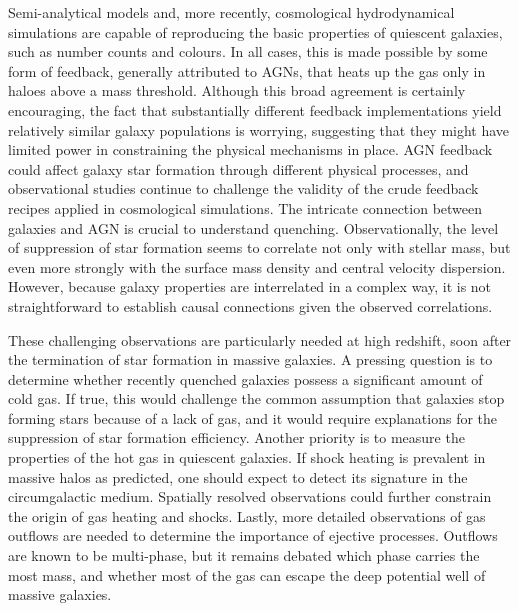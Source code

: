 \documentclass[a4paper,11pt]{article}
\begin{document}
{\noindent}Semi-analytical models and, more recently, cosmological hydrodynamical simulations are capable of reproducing the basic properties of quiescent galaxies, such as number counts and colours. In all cases, this is made possible by some form of feedback, generally attributed to AGNs, that heats up the gas only in haloes above a mass threshold. Although this broad agreement is certainly encouraging, the fact that substantially different feedback implementations yield relatively similar galaxy populations is worrying, suggesting that they might have limited power in constraining the physical mechanisms in place. AGN feedback could affect galaxy star formation through different physical processes, and observational studies continue to challenge the validity of the crude feedback recipes applied in cosmological simulations. The intricate connection between galaxies and AGN is crucial to understand quenching. Observationally, the level of suppression of star formation seems to correlate not only with stellar mass, but even more strongly with the surface mass density and central velocity dispersion. However, because galaxy properties are interrelated in a complex way, it is not straightforward to establish causal connections given the observed correlations.

{\noindent} These challenging observations are particularly needed at high redshift, soon after the termination of star formation in massive galaxies. A pressing question is to determine whether recently quenched galaxies possess a significant amount of cold gas. If true, this would challenge the common assumption that galaxies stop forming stars because of a lack of gas, and it would require explanations for the suppression of star formation efficiency. Another priority is to measure the properties of the hot gas in quiescent galaxies. If shock heating is prevalent in massive halos as predicted, one should expect to detect its signature in the circumgalactic medium. Spatially resolved observations could further constrain the origin of gas heating and shocks. Lastly, more detailed observations of gas outflows are needed to determine the importance of ejective processes. Outflows are known to be multi-phase, but it remains debated which phase carries the most mass, and whether most of the gas can escape the deep potential well of massive galaxies.
\end{document}
